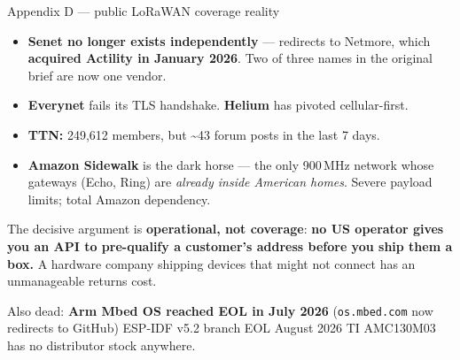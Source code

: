 \documentclass[aspectratio=169,t,10pt,xcolor={table,svgnames}]{beamer}
\begin{document}
\begin{frame}{Appendix D --- public LoRaWAN coverage reality}
  \footnotesize
  \begin{itemize}
    \item \textbf{Senet no longer exists independently} --- redirects to Netmore, which
          \textbf{acquired Actility in January 2026}. Two of three names in the original brief are
          now one vendor.
    \item \textbf{Everynet} fails its TLS handshake. \textbf{Helium} has pivoted cellular-first.
    \item \textbf{TTN:} 249{,}612 members, but \textasciitilde43 forum posts in the last 7 days.
    \item \textbf{Amazon Sidewalk} is the dark horse --- the only 900\,MHz network whose gateways
          (Echo, Ring) are \emph{already inside American homes}. Severe payload limits; total Amazon
          dependency.
  \end{itemize}
  \vspace{0.5em}
  \begin{beamercolorbox}[wd=\textwidth,sep=1.6ex]{}
    \color{ink}\small The decisive argument is \textbf{operational, not coverage}: \textbf{no US
    operator gives you an API to pre-qualify a customer's address before you ship them a box.}
    A hardware company shipping devices that might not connect has an unmanageable returns cost.
  \end{beamercolorbox}
  \vspace{0.5em}
  {\scriptsize\color{inkmute} Also dead: \textbf{Arm Mbed OS reached EOL in July 2026}
   (\texttt{os.mbed.com} now redirects to GitHub) \textperiodcentered{} ESP-IDF v5.2 branch EOL
   August 2026 \textperiodcentered{} TI AMC130M03 has no distributor stock anywhere.\par}
\end{frame}
\end{document}
